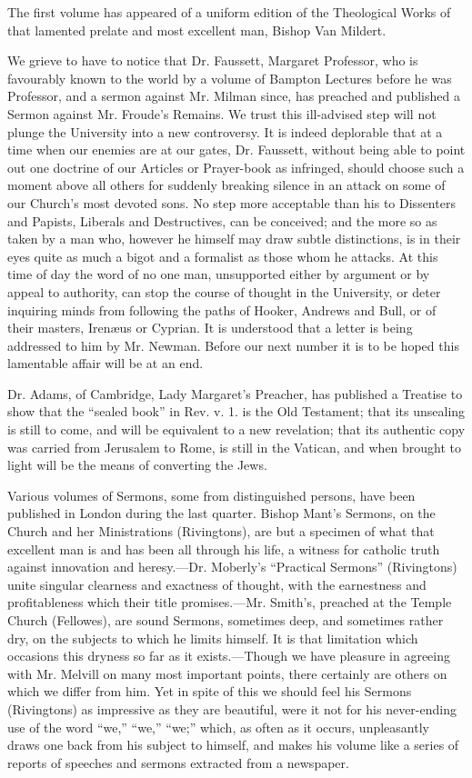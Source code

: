 The first volume has appeared of a uniform edition
of the Theological Works of that lamented prelate and most excellent
man, Bishop Van Mildert.

We grieve to have to notice that Dr. Faussett,
Margaret Professor, who is favourably known to the world by a volume of
Bampton Lectures before he was Professor, and a sermon against Mr.
Milman since, has preached and published a Sermon against Mr. Froude's
Remains. We trust this ill-advised step will not plunge the University
into a new controversy. It is indeed deplorable that at a time when our
enemies are at our gates, Dr. Faussett, without being able to point out
one doctrine of our Articles or Prayer-book as infringed, should choose
such a moment above all others for suddenly breaking silence in an
attack on some of our Church's most devoted sons. No step more
acceptable than his to Dissenters and Papists, Liberals and
Destructives, can be conceived; and the more so as taken by a man who,
however he himself may draw subtle distinctions, is in their eyes quite
as much a bigot and a formalist as those whom he attacks. At this time
of day the word of no one man, unsupported either by argument or by
appeal to authority, can stop the course of thought in the University,
or deter inquiring minds from following the paths of Hooker, Andrews and
Bull, or of their masters, Irenæus or Cyprian. It is understood that a
letter is being addressed to him by Mr. Newman. Before our next number
it is to be hoped this lamentable affair will be at an end.

Dr. Adams, of Cambridge, Lady Margaret's Preacher,
has published a Treatise to show that the ``sealed book'' in Rev. v. 1. is
the Old Testament; that its unsealing is still to come, and will be
equivalent to a new revelation; that its authentic copy was carried from
Jerusalem to Rome, is still in the Vatican, and when brought to light
will be the means of converting the Jews.

Various volumes of Sermons, some from distinguished
persons, have been published in London during the last quarter. Bishop
Mant's Sermons, on the Church and her Ministrations (Rivingtons), are
but a specimen of what that excellent man is and has been all through
his life, a witness for catholic truth against innovation and
heresy.—Dr. Moberly's ``Practical Sermons'' (Rivingtons) unite singular
clearness and exactness of thought, with the earnestness and
profitableness which their title promises.—Mr. Smith's, preached at
the Temple Church (Fellowes), are sound Sermons, sometimes deep, and
sometimes rather dry, on the subjects to which he limits himself. It is
that limitation which occasions this dryness so far as it
exists.—Though we have pleasure in agreeing with Mr. Melvill on many
most important points, there certainly are others on which we differ
from him. Yet in spite of this we should feel his Sermons (Rivingtons)
as impressive as they are beautiful, were it not for his never-ending
use of the word ``we,'' ``we,'' ``we;'' which, as often as it occurs,
unpleasantly draws one back from his subject to himself, and makes his
volume like a series of reports of speeches and sermons extracted from a
newspaper.

